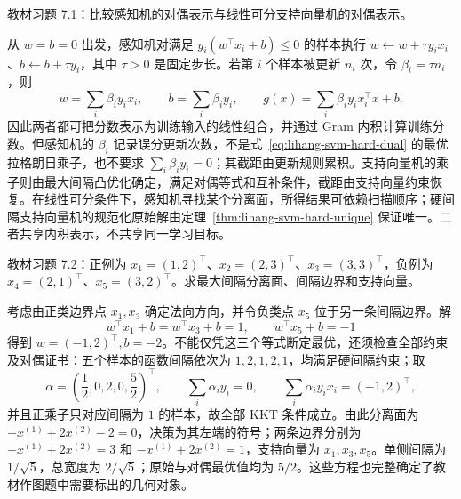 \begin{example}
\label{ex:lihang-svm-perceptron-dual}
教材习题 7.1：比较感知机的对偶表示与线性可分支持向量机的对偶表示。
\end{example}
\begin{solve}
从 $w=b=0$ 出发，感知机对满足 $y_i(w^\top x_i+b)\le0$ 的样本执行 $w\leftarrow w+\tau y_i x_i$、$b\leftarrow b+\tau y_i$，其中 $\tau>0$ 是固定步长。若第 $i$ 个样本被更新 $n_i$ 次，令 $\beta_i=\tau n_i$，则
\[
  w=\sum_i\beta_i y_i x_i,
  \qquad b=\sum_i\beta_i y_i,
  \qquad g(x)=\sum_i\beta_i y_i x_i^\top x+b.
\]
因此两者都可把分数表示为训练输入的线性组合，并通过 Gram 内积计算训练分数。但感知机的 $\beta_i$ 记录误分更新次数，不是式~\eqref{eq:lihang-svm-hard-dual} 的最优拉格朗日乘子，也不要求 $\sum_i\beta_i y_i=0$；其截距由更新规则累积。支持向量机的乘子则由最大间隔凸优化确定，满足对偶等式和互补条件，截距由支持向量约束恢复。在线性可分条件下，感知机寻找某个分离面，所得结果可依赖扫描顺序；硬间隔支持向量机的规范化原始解由定理~\ref{thm:lihang-svm-hard-unique} 保证唯一。二者共享内积表示，不共享同一学习目标。
\end{solve}

\begin{example}
\label{ex:lihang-svm-five-points}
教材习题 7.2：正例为 $x_1=(1,2)^\top$、$x_2=(2,3)^\top$、$x_3=(3,3)^\top$，负例为 $x_4=(2,1)^\top$、$x_5=(3,2)^\top$。求最大间隔分离面、间隔边界和支持向量。
\end{example}
\begin{solve}
考虑由正类边界点 $x_1,x_3$ 确定法向方向，并令负类点 $x_5$ 位于另一条间隔边界。解
\[
  w^\top x_1+b=w^\top x_3+b=1,
  \qquad w^\top x_5+b=-1
\]
得到 $w=(-1,2)^\top,b=-2$。不能仅凭这三个等式断定最优，还须检查全部约束及对偶证书：五个样本的函数间隔依次为 $1,2,1,2,1$，均满足硬间隔约束；取
\[
  \alpha=\left(\frac12,0,2,0,\frac52\right)^\top,
  \qquad \sum_i\alpha_i y_i=0,
  \qquad\sum_i\alpha_i y_i x_i=(-1,2)^\top,
\]
并且正乘子只对应间隔为 $1$ 的样本，故全部 KKT 条件成立。由此分离面为 $-x^{(1)}+2x^{(2)}-2=0$，决策为其左端的符号；两条边界分别为 $-x^{(1)}+2x^{(2)}=3$ 和 $-x^{(1)}+2x^{(2)}=1$，支持向量为 $x_1,x_3,x_5$。单侧间隔为 $1/\sqrt5$，总宽度为 $2/\sqrt5$；原始与对偶最优值均为 $5/2$。这些方程也完整确定了教材作图题中需要标出的几何对象。
\end{solve}

